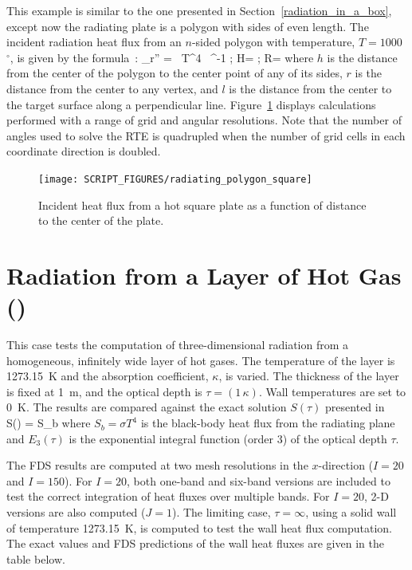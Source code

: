 \documentclass[11pt]{book}
\begin{document}
This example is similar to the one presented in Section~\ref{radiation_in_a_box}, except now the radiating plate is a polygon with sides of even length. The incident radiation heat flux from an $n$-sided polygon with temperature, $T=1000$~$^\circ$, is given by the formula~\cite{Siegel:1}:
\be
   \dq_{\rm r}'' = \sigma \, T^4 \,  \; \tan^{-1}  \quad ; \quad H= \quad ; \quad R=
   \label{plate_view_factor_eq}
\ee
where $h$ is the distance from the center of the polygon to the center point of any of its sides, $r$ is the distance from the center to any vertex, and $l$ is the distance from the center to the target surface along a perpendicular line. Figure~\ref{radiating_polygon_figure} displays calculations performed with a range of grid and angular resolutions. Note that the number of angles used to solve the RTE is quadrupled when the number of grid cells in each coordinate direction is doubled.

\begin{figure}[ht]
\centering
\texttt{[image: SCRIPT\_FIGURES/radiating\_polygon\_square]}
\caption[The {\ct radiating\_polygon} test case]{Incident heat flux from a hot square plate as a function of distance to the center of the plate.}
\label{radiating_polygon_figure}
\end{figure}



\section{Radiation from a Layer of Hot Gas (\texorpdfstring{}{radiation\_plane\_layer})}
\label{radiation_plane_layer}

This case tests the computation of three-dimensional radiation from a homogeneous, infinitely wide layer of hot gases.  The temperature of
the layer is 1273.15~K and the absorption coefficient, $\kappa$, is varied. The thickness of the layer is fixed at 1~m, and the optical depth is $\tau = (1 \, \kappa)$.
Wall temperatures are set to 0~K. The results are compared against the exact solution $S(\tau)$ presented in~\cite{Zeldovich:1}
\be S(\tau) = S_b \ee
where $S_b = \sigma T^4$ is the black-body heat flux from the radiating plane and $E_3(\tau)$ is the exponential
integral function (order 3) of the optical depth $\tau$.

The FDS results are computed at two mesh resolutions in the $x$-direction ($I=20$ and $I=150$). For $I=20$, both one-band and six-band versions are
included to test the correct integration of heat fluxes over multiple bands. For $I=20$, 2-D versions are also computed ($J=1$). The limiting case, $\tau=\infty$,
using a solid wall of temperature 1273.15~K, is computed to test the wall heat flux computation. The exact values and FDS predictions of
the wall heat fluxes are given in the table below.
\end{document}
